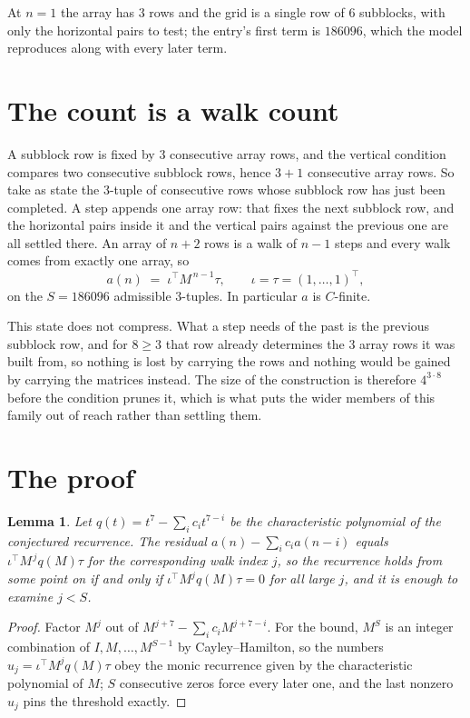 \documentclass[11pt,a4paper]{article}
\theoremstyle{plain}
\newtheorem{lemma}[theorem]{Lemma}
\theoremstyle{definition}
\begin{document}
At $n=1$ the array has $3$ rows and the grid is a single row of $6$
subblocks, with only the horizontal pairs to test; the entry's first term is
$186096$, which the model reproduces along with every later term.

\section{The count is a walk count}

A subblock row is fixed by $3$ consecutive array rows, and the vertical condition compares
two consecutive subblock rows, hence $3+1$ consecutive array rows. So take as state the
$3$-tuple of consecutive rows whose subblock row has just been completed. A step appends one
array row: that fixes the next subblock row, and the horizontal pairs inside it and the
vertical pairs against the previous one are all settled there. An array of $n+2$ rows is
a walk of $n-1$ steps and every walk comes from exactly one array, so
\[
a(n)\;=\;\iota^{\!\top}M^{\,n-1}\tau,\qquad\iota=\tau=(1,\dots,1)^{\!\top},
\]
on the $S=186096$ admissible $3$-tuples. In particular $a$ is $C$-finite.

This state does not compress. What a step needs of the past is the previous subblock row, and
for $8\ge3$ that row already determines the $3$ array rows it was built from, so nothing
is lost by carrying the rows and nothing would be gained by carrying the matrices instead. The
size of the construction is therefore $4^{3\cdot8}$ before the condition prunes
it, which is what puts the wider members of this family out of reach rather than settling them.

\section{The proof}

\begin{lemma}\label{lem:crit}
Let $q(t)=t^{7}-\sum_i c_it^{7-i}$ be the characteristic polynomial of the
conjectured recurrence. The residual $a(n)-\sum_ic_ia(n-i)$ equals
$\iota^{\!\top}M^{\,j}q(M)\tau$ for the corresponding walk index $j$, so the recurrence
holds from some point on if and only if $\iota^{\!\top}M^{j}q(M)\tau=0$ for all large $j$,
and it is enough to examine $j<S$.
\end{lemma}

\begin{proof}
Factor $M^{j}$ out of $M^{j+7}-\sum_ic_iM^{j+7-i}$. For the bound, $M^{S}$
is an integer combination of $I,M,\dots,M^{S-1}$ by Cayley--Hamilton, so the numbers
$u_j=\iota^{\!\top}M^{j}q(M)\tau$ obey the monic recurrence given by the characteristic
polynomial of $M$; $S$ consecutive zeros force every later one, and the last nonzero $u_j$
pins the threshold exactly.
\end{proof}
\end{document}

